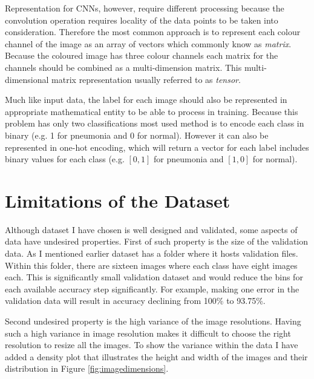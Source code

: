 Representation for CNNs, however, require different processing because the convolution operation requires locality of the data points to be taken into consideration.
Therefore the most common approach is to represent each colour channel of the image as an array of vectors which commonly know as \emph{matrix}.
Because the coloured image has three colour channels each matrix for the channels should be combined as a multi-dimension matrix.
This multi-dimensional matrix representation usually referred to as \emph{tensor}.

Much like input data, the label for each image should also be represented in appropriate mathematical entity to be able to process in training.
Because this problem has only two classifications most used method is to encode each class in binary (e.g. 1 for pneumonia and 0 for normal).
However it can also be represented in one-hot encoding, which will return a vector for each label includes binary values for each class (e.g. $[0, 1]$ for pneumonia and $[1, 0]$ for normal).


\section{Limitations of the Dataset} \label{sec:datalimitations}
Although dataset I have chosen is well designed and validated, some aspects of data have undesired properties.
First of such property is the size of the validation data.
As I mentioned earlier dataset has a folder where it hosts validation files.
Within this folder, there are sixteen images where each class have eight images each.
This is significantly small validation dataset and would reduce the bins for each available accuracy step significantly.
For example, making one error in the validation data will result in accuracy declining from 100\% to 93.75\%.

Second undesired property is the high variance of the image resolutions.
Having such a high variance in image resolution makes it difficult to choose the right resolution to resize all the images.
To show the variance within the data I have added a density plot that illustrates the height and width of the images and their distribution in Figure \ref{fig:imagedimensions}.

